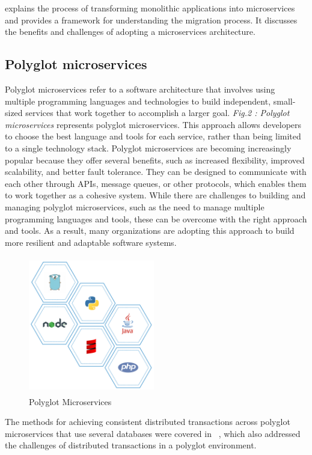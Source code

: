 \cite{escobar2016towards}explains the process of transforming monolithic applications into microservices and provides a framework for understanding the migration process. It discusses the benefits and challenges of adopting a microservices architecture.

\subsection{ Polyglot microservices}
Polyglot microservices refer to a software architecture that involves using multiple programming languages and technologies to build independent, small-sized services that work together to accomplish a larger goal. \emph{Fig.2 : Polyglot microservices} represents polyglot microservices. This approach allows developers to choose the best language and tools for each service, rather than being limited to a single technology stack. Polyglot microservices are becoming increasingly popular because they offer several benefits, such as increased flexibility, improved scalability, and better fault tolerance. They can be designed to communicate with each other through APIs, message queues, or other protocols, which enables them to work together as a cohesive system.
While there are challenges to building and managing polyglot microservices, such as the need to manage multiple programming languages and tools, these can be overcome with the right approach and tools. As a result, many organizations are adopting this approach to build more resilient and adaptable software systems.

\begin{figure}
\centering
\includegraphics[width=5.5cm, height=6cm]{polyglot_microservices}
\caption{Polyglot Microservices}
\end{figure}

The methods for achieving consistent distributed transactions across polyglot microservices that use several databases were covered in  ~\cite{zhang2019grit}, which also addressed the challenges of distributed transactions in a polyglot environment.


